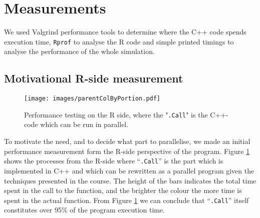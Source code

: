 

\section{Measurements}

We used Valgrind performance tools to determine where the C++ code
spends execution time, \texttt{Rprof} to analyse the R code and simple
printed timings to analyse the performance of the whole simulation. 

\subsection{Motivational R-side measurement}

\begin{figure}[!htbp] \centering
  \texttt{[image: images/parentColByPortion.pdf]}
  \caption{Performance testing on the R side, where the "\texttt{.Call}" is the
C++-code which can be run in parallel.}
  \label{fig:rMot}
\end{figure}

To motivate the need, and to decide what part to parallelise, we made
an initial performance measurement form the R-side perspective of the
program. Figure \ref{fig:rMot} shows the processes from the R-side
where ``\texttt{.Call}'' is the part which is implemented in C++ and
which can be rewritten as a parallel program given the techniques
presented in the course. The height of the bars indicates the total
time spent in the call to the function, and the brighter the colour
the more time is spent in the actual function. From Figure
\ref{fig:rMot} we can conclude that ``\texttt{.Call}'' itself
constitutes over 95\% of the program execution time.

\clearpage{}
